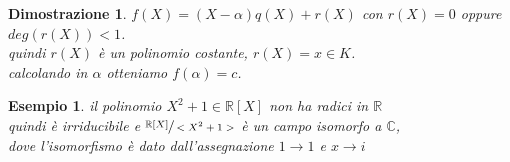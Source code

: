 \documentclass[a4paper,12pt]{article}
\theoremstyle{def}
\theoremstyle{prop}
\theoremstyle{esempio}
\newtheorem*{example}{Esempio}
\theoremstyle{dimostrazione}
\newtheorem*{dimostrazione}{Dimostrazione}
\theoremstyle{teo}
\theoremstyle{osservazione}
\begin{document}
\begin{dimostrazione}
    \(f(X) = (X - \alpha) q(X) + r(X)\) con \(r(X) = 0\) oppure \(deg(r(X)) < 1\).\\
    quindi \(r(X)\) è un polinomio costante, \(r(X) = x \in K\).\\
    calcolando in \(\alpha\) otteniamo \(f(\alpha) = c\).\\
\end{dimostrazione}

\begin{example}
    il polinomio \(X^2 + 1 \in \mathbb{R}[X]\) non ha radici in \(\mathbb{R}\)\\
    quindi è irriducibile e \(\sfrac{\mathbb{R}[X]}{<X^2 + 1>}\) è un campo isomorfo a \(\mathbb{C}\),\\
    dove l'isomorfismo è dato dall'assegnazione \(1 \rightarrow 1\) e \(x \rightarrow i\)\\
\end{example}
\end{document}
